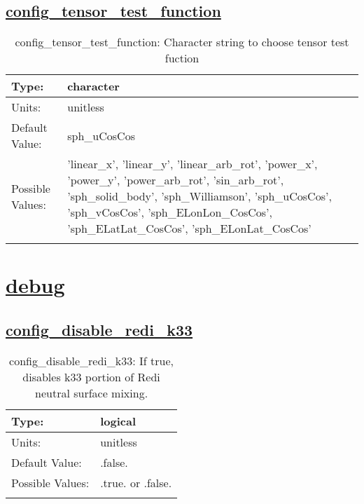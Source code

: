 \subsection[config\_tensor\_test\_function]{\hyperref[sec:nm_tab_testing]{config\_tensor\_test\_function}}
\label{subsec:nm_sec_config_tensor_test_function}
\begin{center}
\begin{longtable}{| p{2.0in} || p{4.0in} |}
    \hline
    Type: & character \\
    \hline
    Units: & \si{unitless} \\
    \hline
    Default Value: & sph\_uCosCos \\
    \hline
    Possible Values: & 'linear\_x', 'linear\_y', 'linear\_arb\_rot', 'power\_x', 'power\_y', 'power\_arb\_rot', 'sin\_arb\_rot', 'sph\_solid\_body', 'sph\_Williamson', 'sph\_uCosCos', 'sph\_vCosCos', 'sph\_ELonLon\_CosCos', 'sph\_ELatLat\_CosCos', 'sph\_ELonLat\_CosCos' \\
    \hline
    \caption{config\_tensor\_test\_function: Character string to choose tensor test fuction}
\end{longtable}
\end{center}
\section[debug]{\hyperref[sec:nm_tab_debug]{debug}}
\label{sec:nm_sec_debug}
\subsection[config\_disable\_redi\_k33]{\hyperref[sec:nm_tab_debug]{config\_disable\_redi\_k33}}
\label{subsec:nm_sec_config_disable_redi_k33}
\begin{center}
\begin{longtable}{| p{2.0in} || p{4.0in} |}
    \hline
    Type: & logical \\
    \hline
    Units: & \si{unitless} \\
    \hline
    Default Value: & .false. \\
    \hline
    Possible Values: & .true. or .false. \\
    \hline
    \caption{config\_disable\_redi\_k33: If true, disables k33 portion of Redi neutral surface mixing.}
\end{longtable}
\end{center}
